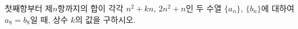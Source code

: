 첫째항부터 제$n$항까지의 합이 각각 $n^2+kn$, $2n^2+n$인 두 수열 $\{a_n\}$, $\{b_n\}$에 대하여 $a_8=b_8$일 때, 상수 $k$의 값을 구하시오.
